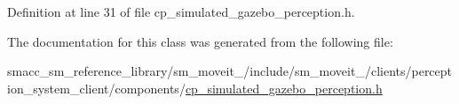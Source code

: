 Definition at line 31 of file cp\+\_\+simulated\+\_\+gazebo\+\_\+perception.\+h.



The documentation for this class was generated from the following file\+:\begin{DoxyCompactItemize}
\item 
smacc\+\_\+sm\+\_\+reference\+\_\+library/sm\+\_\+moveit\+\_/include/sm\+\_\+moveit\+\_/clients/perception\+\_\+system\+\_\+client/components/\hyperlink{cp__simulated__gazebo__perception_8h}{cp\+\_\+simulated\+\_\+gazebo\+\_\+perception.\+h}\end{DoxyCompactItemize}
